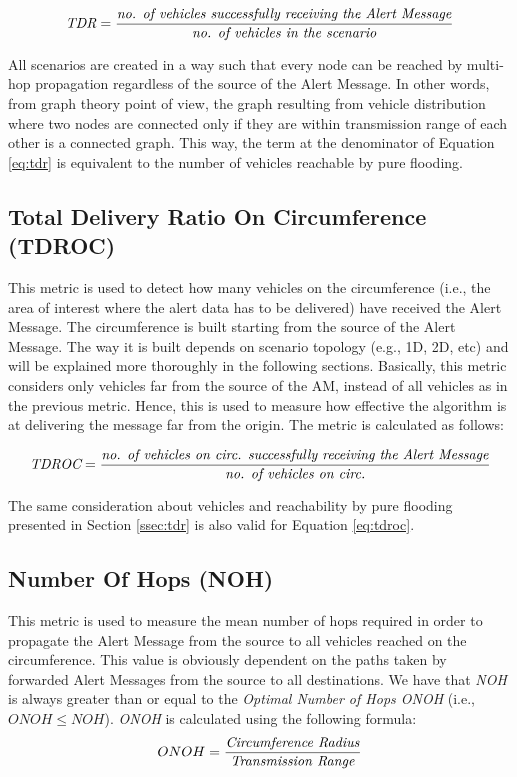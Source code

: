 			\begin{gather}
				\label{eq:tdr}
				\textit{TDR} = \frac{\textrm{\textit{no. of vehicles successfully receiving the Alert Message}}}{\textrm{\textit{no. of vehicles in the scenario}}}
			\end{gather}
			
			All scenarios are created in a way such that every node can be reached by multi-hop propagation regardless of the source of the Alert Message. In other words, from graph theory point of view, the graph resulting from vehicle distribution where two nodes are connected only if they are within transmission range of each other is a connected graph. This way, the term at the denominator of Equation \ref{eq:tdr} is equivalent to the number of vehicles reachable by pure flooding.
			
		\subsection{Total Delivery Ratio On Circumference (TDROC)}
			This metric is used to detect how many vehicles on the circumference (i.e., the area of interest where the alert data has to be delivered) have received the Alert Message. The circumference is built starting from the source of the Alert Message. The way it is built depends on scenario topology (e.g., 1D, 2D, etc) and will be explained more thoroughly in the following sections. Basically, this metric considers only vehicles far from the source of the AM, instead of all vehicles as in the previous metric. Hence, this is used to measure how effective the algorithm is at delivering the message far from the origin. The metric is calculated as follows:
			
			\begin{gather}
			 	\label{eq:tdroc}
			 	\textit{TDROC} = \frac{\textrm{\textit{no. of vehicles on circ. successfully receiving the Alert Message}}}{\textrm{\textit{no. of vehicles on circ.}}}
			\end{gather}
		
			The same consideration about vehicles and reachability by pure flooding presented in Section \ref{ssec:tdr} is also valid for Equation \ref{eq:tdroc}.
			
		\subsection{Number Of Hops (NOH)}
			This metric is used to measure the mean number of hops required in order to propagate the Alert Message from the source to all vehicles reached on the circumference. This value is obviously dependent on the paths taken by forwarded Alert Messages from the source to all destinations. We have that \textit{NOH} is always greater than or equal to the \textit{Optimal Number of Hops ONOH} (i.e., $ONOH \leq NOH$). \textit{ONOH} is calculated using the following formula:
			$$ ONOH = \frac{\textrm{\textit{Circumference Radius}}}{\textrm{\textit{Transmission Range}}} $$
			
